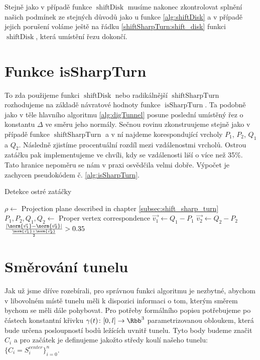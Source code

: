 Stejně jako v případě funkce $ \operatorname{shiftDisk} $ musíme nakonec
zkontrolovat splnění našich podmínek ze stejných důvodů jako u funkce
\ref{alg:shiftDisk} a v případě jejich porušení voláme ještě
na řádku \ref{shiftSharpTurn:shift_disk} funkci $ \operatorname{shiftDisk} $,
která umístění řezu dokončí.





\section{Funkce isSharpTurn} \label{subsec:is_sharp_turn}
To zda použijeme funkci $ \operatorname{shiftDisk} $ nebo radikálnější
$ \operatorname{shiftSharpTurn} $ rozhodujeme na základě návratové hodnoty
funkce $ \operatorname{isSharpTurn} $. Ta podobně jako v těle hlavního
algoritmu \ref{alg:digTunnel} posune poslední umístěný řez o konstantu
$ \Delta $ ve směru jeho normály. Sečnou rovinu zkonstruujeme stejně jako v
případě funkce $ \operatorname{shiftSharpTurn} $ a v ní najdeme korespondující
vrcholy $ P_1$, $P_2$, $Q_1$ a $ Q_2 $. Následně zjistíme procentuální rozdíl
mezi vzdálenostmi vrcholů. Ostrou zatáčku pak implementujeme ve chvíli, kdy se
vzdálenosti liší o více než 35\%. Tato hranice nepoměru se nám v praxi osvědčila
velmi dobře. Výpočet je zachycen pseudokódem č. \ref{alg:isSharpTurn}.

\begin{algorithm}
\caption{Detekce ostré zatáčky}
\label{alg:isSharpTurn}
\begin{algorithmic}[1]

    \State $ \rho \gets $ Projection plane described in chapter \ref{subsec:shift_sharp_turn}
    \State $ P_1, P_2, Q_1, Q_2 \gets $ Proper vertex correspondence
    \State $ \vec{v_1} \gets Q_1 - P_1 $
    \State $ \vec{v_2} \gets Q_2 - P_2 $
    \State \Return $ \frac{\left| \norm{\vec{v_1}} - \norm{\vec{v_2}} \right|}
                          {\frac{\norm{\vec{v_1}} + \norm{\vec{v_2}}}{2}} > 0.35$
\EndFunction

\end{algorithmic}
\end{algorithm}





\section{Směrování tunelu} \label{subsec:tunnel_dir}
Jak už jsme dříve rozebírali, pro správnou funkci algoritmu je nezbytné, abychom
v libovolném místě tunelu měli k dispozici informaci o tom, kterým směrem bychom
se měli dále pohybovat. Pro potřeby formálního popisu potřebujeme
po částech konstantní křivku $ \gamma(t) \colon [0, l] \to \Rbb^3$
parametrizovanou obloukem, která bude
určena posloupností bodů ležících uvnitř tunelu. Tyto body budeme značit
$ C_i $ a pro začátek je definujeme jakožto středy koulí našeho tunelu:
$ \{C_i = S_i^{center}\}_{i=0}^{n} $.

